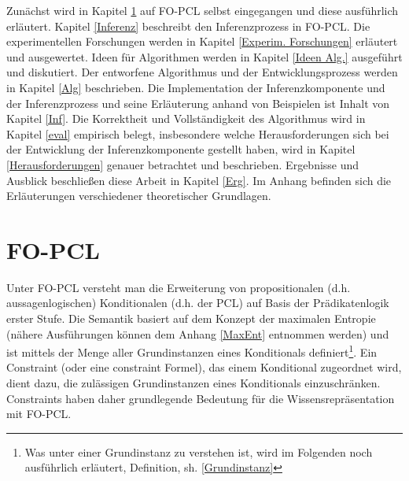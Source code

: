 \documentclass[a4paper, 11pt]{book}
\begin{document}
Zunächst wird in Kapitel \ref{FO-PCL} auf FO-PCL selbst eingegangen und diese ausführlich erläutert. Kapitel \ref{Inferenz} beschreibt den Inferenzprozess in FO-PCL. Die experimentellen Forschungen werden in Kapitel \ref{Experim. Forschungen} erläutert und ausgewertet. Ideen für Algorithmen werden in Kapitel \ref{Ideen Alg.} ausgeführt und diskutiert. Der entworfene Algorithmus und der Entwicklungsprozess werden in Kapitel \ref{Alg}  beschrieben. Die Implementation der Inferenzkomponente und der Inferenzprozess  und seine Erläuterung anhand von Beispielen ist Inhalt von Kapitel \ref{Inf}. 
 Die Korrektheit und Vollständigkeit des Algorithmus wird in Kapitel \ref{eval} empirisch belegt, insbesondere welche Herausforderungen sich bei der Entwicklung der Inferenzkomponente gestellt haben, wird in Kapitel \ref{Herausforderungen} genauer betrachtet und beschrieben.
  Ergebnisse und Ausblick beschließen diese Arbeit in Kapitel \ref{Erg}. Im Anhang befinden sich die Erläuterungen verschiedener theoretischer Grundlagen.



\newpage

\chapter{FO-PCL}\label{FO-PCL} 
Unter FO-PCL versteht man die Erweiterung von propositionalen (d.h. aussagenlogischen) Konditionalen (d.h. der PCL) auf Basis der Prädikatenlogik erster Stufe. Die Semantik basiert auf dem Konzept der maximalen Entropie (nähere Ausführungen können dem Anhang \ref{MaxEnt} entnommen werden) und ist mittels der Menge aller Grundinstanzen eines Konditionals definiert\footnote{Was unter einer Grundinstanz zu verstehen ist, wird im Folgenden noch ausführlich erläutert, Definition, sh. \ref{Grundinstanz} }. Ein Constraint  (oder eine constraint Formel), das einem Konditional  zugeordnet wird, dient dazu,  die zulässigen Grundinstanzen eines Konditionals einzuschränken. Constraints haben daher grundlegende Bedeutung für die Wissensrepräsentation mit FO-PCL.
\end{document}
